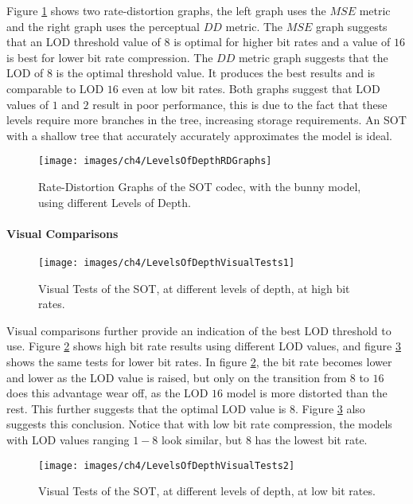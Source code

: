 Figure \ref{LevelsOfDepthRDGraphs} shows two rate-distortion graphs, the left graph uses the $MSE$ metric and the right graph uses the perceptual $DD$ metric. The $MSE$ graph suggests that an LOD threshold value of $8$ is optimal for higher bit rates and a value of $16$ is best for lower bit rate compression. The $DD$ metric graph suggests that the LOD of $8$ is the optimal threshold value. It produces the best results and is comparable to LOD $16$ even at low bit rates. Both graphs suggest that LOD values of $1$ and $2$ result in poor performance, this is due to the fact that these levels require more branches in the tree, increasing storage requirements. An SOT with a shallow tree that accurately accurately approximates the model is ideal.

\begin{figure}[!h]
\centering
\texttt{[image: images/ch4/LevelsOfDepthRDGraphs]}
\caption{Rate-Distortion Graphs of the SOT codec, with the bunny model, using different Levels of Depth.}
\label{LevelsOfDepthRDGraphs}
\end{figure}

\paragraph{Visual Comparisons}

\begin{figure}[!h]
\centering
\texttt{[image: images/ch4/LevelsOfDepthVisualTests1]}
\caption{Visual Tests of the SOT, at different levels of depth, at high bit rates.}
\label{LevelsOfDepthVisualTests1}
\end{figure}

Visual comparisons further provide an indication of the best LOD threshold to use. Figure \ref{LevelsOfDepthVisualTests1} shows high bit rate results using different LOD values, and figure \ref{LevelsOfDepthVisualTests2} shows the same tests for lower bit rates. In figure \ref{LevelsOfDepthVisualTests1}, the bit rate becomes lower and lower as the LOD value is raised, but only on the transition from $8$ to $16$ does this advantage wear off, as the LOD $16$ model is more distorted than the rest. This further suggests that the optimal LOD value is $8$. Figure \ref{LevelsOfDepthVisualTests2} also suggests this conclusion. Notice that with low bit rate compression, the models with LOD values ranging $1-8$ look similar, but $8$ has the lowest bit rate.

\begin{figure}[!h]
\centering
\texttt{[image: images/ch4/LevelsOfDepthVisualTests2]}
\caption{Visual Tests of the SOT, at different levels of depth, at low bit rates.}
\label{LevelsOfDepthVisualTests2}
\end{figure}

